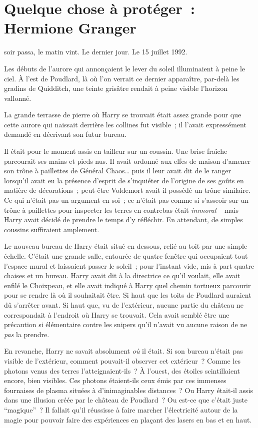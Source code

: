 \chapter{Quelque chose à protéger~: Hermione Granger}

 soir passa, le matin vint.
Le dernier jour.
Le 15 juillet 1992.

\hplettrineextrapara
Les débuts de l'aurore qui annonçaient le lever du soleil illuminaient à peine le ciel.
À l'est de Poudlard, là où l'on verrait ce dernier apparaître, par-delà les gradins de Quidditch, une teinte grisâtre rendait à peine visible l'horizon vallonné.

La grande terrasse de pierre où Harry se trouvait était assez grande pour que cette aurore qui naissait derrière les collines fut visible~; il l'avait expressément demandé en décrivant son futur bureau.

Il était pour le moment assis en tailleur sur un coussin.
Une brise fraîche parcourait ses mains et pieds nus.
Il avait ordonné aux elfes de maison d'amener son trône à paillettes de Général Chaos… puis il leur avait dit de le ranger lorsqu'il avait eu la présence d'esprit de s'inquiéter de l'origine de ses goûts en matière de décorations~; peut-être Voldemort avait-il possédé un trône similaire.
Ce qui n'était pas un argument en soi~; ce n'était pas comme si s'asseoir sur un trône à paillettes pour inspecter les terres en contrebas était \emph{immoral} -- mais Harry avait décidé de prendre le temps d'y réfléchir.
En attendant, de simples coussins suffiraient amplement.

Le nouveau bureau de Harry était situé en dessous, relié au toit par une simple échelle.
C'était une grande salle, entourée de quatre fenêtre qui occupaient tout l'espace mural et laissaient passer le soleil~; pour l'instant vide, mis à part quatre chaises et un bureau.
Harry avait dit à la directrice ce qu'il voulait, elle avait enfilé le Choixpeau, et elle avait indiqué à Harry quel chemin tortueux parcourir pour se rendre là où il souhaitait être.
Si haut que les toits de Poudlard auraient dû s'arrêter avant.
Si haut que, vu de l'extérieur, aucune partie du château ne correspondait à l'endroit où Harry se trouvait.
Cela avait semblé être une précaution si élémentaire contre les snipers qu'il n'avait vu aucune raison de ne \emph{pas} la prendre.

En revanche, Harry ne savait absolument \emph{où} il était.
Si son bureau n'était pas visible de l'extérieur, comment pouvait-il observer cet extérieur~?
Comme les photons venus des terres l'atteignaient-ils~?
À l'ouest, des étoiles scintillaient encore, bien visibles.
Ces photons étaient-ils ceux émis par ces immenses fournaises de plasma situées à d'inimaginables distances~?
Ou Harry était-il assis dans une illusion créée par le château de Poudlard~?
Ou est-ce que c'était juste “magique”~?
Il fallait qu'il réussisse à faire marcher l'électricité autour de la magie pour pouvoir faire des expériences en plaçant des lasers en bas et en haut.

